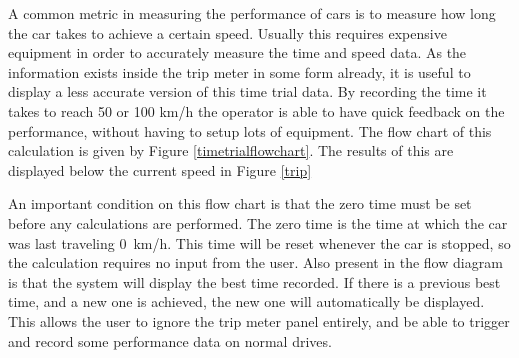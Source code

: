 A common metric in measuring the performance of cars is to measure how long the car takes to achieve a certain speed. Usually this requires expensive equipment in order to accurately measure the time and speed data. As the information exists inside the trip meter in some form already, it is useful to display a less accurate version of this time trial data. By recording the time it takes to reach 50 or 100 km/h the operator is able to have quick feedback on the performance, without having to setup lots of equipment. The flow chart of this calculation is given by Figure \ref{timetrialflowchart}. The results of this are displayed below the current speed in Figure \ref{trip}


An important condition on this flow chart is that the zero time must be set before any calculations are performed. The zero time is the time at which the car was last traveling 0~km/h. This time will be reset whenever the car is stopped, so the calculation requires no input from the user. Also present in the flow diagram is that the system will display the best time recorded. If there is a previous best time, and a new one is achieved, the new one will automatically be displayed. This allows the user to ignore the trip meter panel entirely, and be able to trigger and record some performance data on normal drives.



